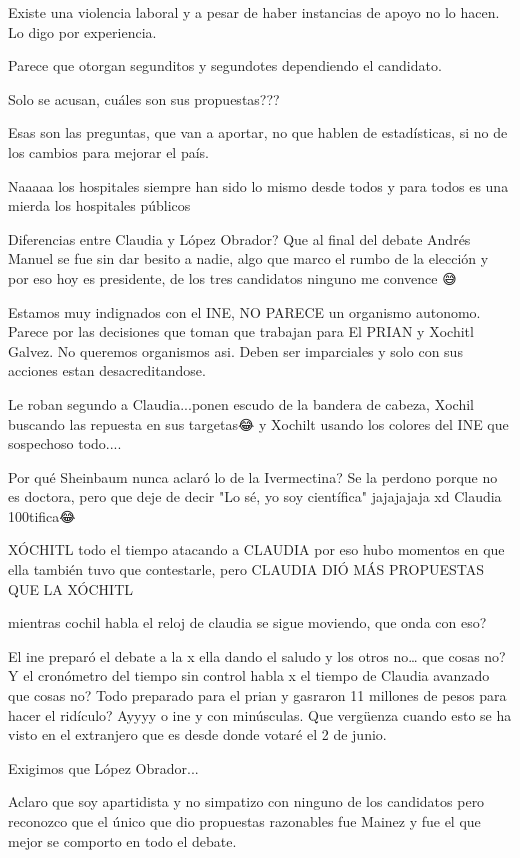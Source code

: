 Existe una violencia laboral y a pesar de haber instancias de apoyo  no lo hacen. Lo digo por experiencia.

Parece que otorgan segunditos y segundotes dependiendo el candidato.

Solo se acusan, cuáles son sus propuestas???

Esas son las preguntas, que van a aportar, no que hablen de estadísticas, si no de los cambios para mejorar el país.

Naaaaa los hospitales siempre han sido lo mismo desde todos y para todos es una mierda los hospitales públicos

Diferencias entre Claudia y López Obrador? Que al final del debate Andrés Manuel se fue sin dar besito a nadie, algo que marco el rumbo de la elección y por eso hoy es presidente, de los tres candidatos ninguno me convence 😅

Estamos muy indignados con el INE, NO PARECE un organismo autonomo. Parece por las decisiones que toman que trabajan para El PRIAN y Xochitl Galvez. No queremos organismos asi. Deben ser imparciales y solo con sus acciones estan  desacreditandose.

Le roban segundo a Claudia...ponen escudo de la bandera de cabeza, Xochil buscando las repuesta en sus targetas😂 y Xochilt usando los colores del INE que sospechoso todo....

Por qué Sheinbaum nunca aclaró lo de la Ivermectina? Se la perdono porque no es doctora, pero que deje de decir "Lo sé, yo soy científica" jajajajaja xd Claudia 100tifica😂

XÓCHITL todo el tiempo atacando a CLAUDIA por eso hubo momentos en que ella también tuvo que contestarle, pero CLAUDIA DIÓ MÁS PROPUESTAS QUE LA XÓCHITL

mientras cochil habla el reloj de claudia se sigue moviendo, que onda con eso?

El ine preparó el debate a la x ella dando el saludo y los otros no… que cosas no? Y el cronómetro del tiempo sin control habla x el tiempo de Claudia avanzado que cosas no? Todo preparado para el prian y gasraron 11 millones de pesos para hacer el ridículo? Ayyyy o ine y con minúsculas. Que vergüenza cuando esto se ha visto en el extranjero que es desde donde votaré el 2 de junio.

Exigimos que López Obrador...

Aclaro que soy apartidista y no simpatizo con ninguno de los candidatos pero reconozco que el único que dio propuestas razonables fue Mainez y fue el que mejor se comporto en todo el debate.

